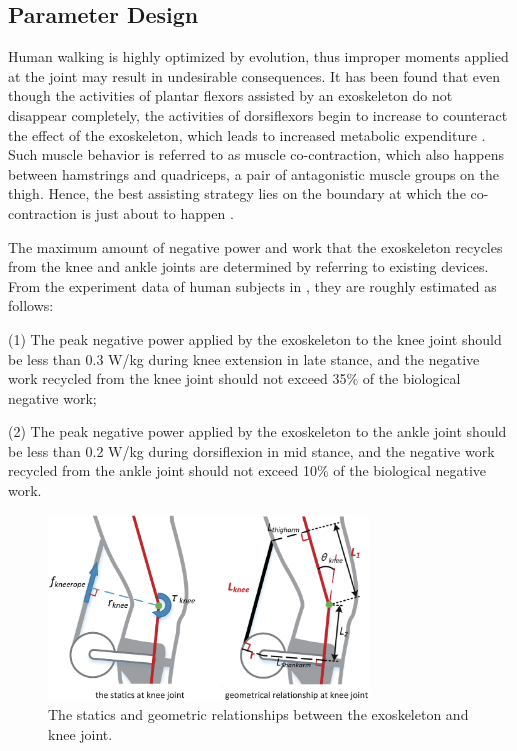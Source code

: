 \documentclass[10pt]{asme2ej}
\begin{document}
\subsection{Parameter Design}

\label{sec:parameter design}

Human walking is highly optimized by evolution, thus improper moments applied at the joint may result in undesirable consequences.
It has been found that even though the activities of plantar flexors assisted by an exoskeleton do not disappear completely, the activities of dorsiflexors begin to increase to counteract the effect of the exoskeleton, which leads to increased metabolic expenditure \cite{RN4}.
Such muscle behavior is referred to as muscle co-contraction, which also happens between hamstrings and quadriceps, a pair of antagonistic muscle groups on the thigh.
Hence, the best assisting strategy lies on the boundary at which the co-contraction is just about to happen \cite{RN22}. 

The maximum amount of negative power and work that the exoskeleton recycles from the knee and ankle joints are determined by referring to existing devices.
From the experiment data of human subjects in \cite{RN5,RN18}, they are roughly estimated as follows:

(1) The peak negative power applied by the exoskeleton to the knee joint should be less than 0.3 W/kg during knee extension in late stance, and the negative work recycled from the knee joint should not exceed 35\% of the biological negative work;

(2) The peak negative power applied by the exoskeleton to the ankle joint should be less than 0.2 W/kg during dorsiflexion in mid stance, and the negative work recycled from the ankle joint should not exceed 10\% of the biological negative work.

\begin{figure}[t]
	\centering
	\includegraphics[width=8.5cm]{kneeparameters.eps}
	\caption{The statics and geometric relationships between the exoskeleton and knee joint.}
	\label{fig:kneeparameters}
\end{figure}
\end{document}

